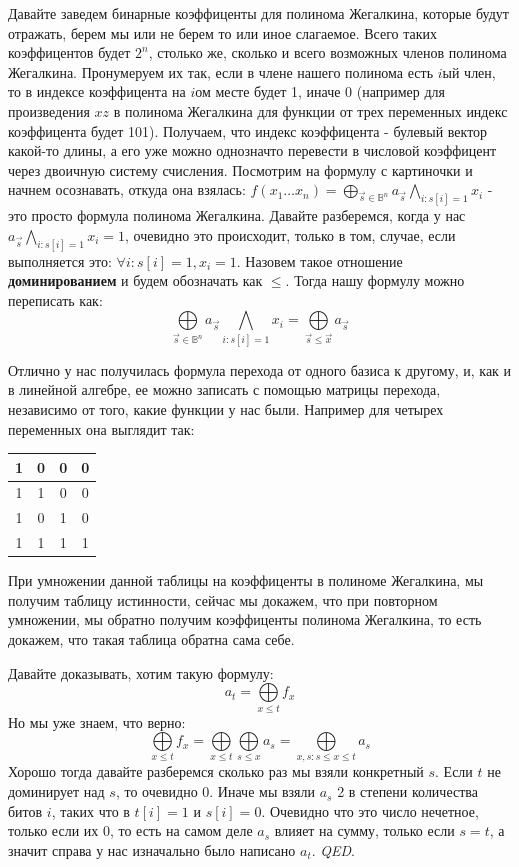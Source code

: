 \documentclass{article}
\begin{document}
Давайте заведем бинарные коэффиценты для полинома Жегалкина, которые будут отражать, берем мы или не берем то или иное слагаемое. Всего таких коэффицентов будет $2^n$, столько же, сколько и всего возможных членов полинома Жегалкина. Пронумеруем их так, если в члене нашего полинома есть $i$ый член, то в индексе коэффицента на $i$ом месте будет 1, иначе 0 (например для произведения $xz$ в полинома Жегалкина для функции от трех переменных индекс коэффицента будет 101). Получаем, что индекс коэффицента - булевый вектор какой-то длины, а его уже можно однозначто перевести в числовой коэффицент через двоичную систему счисления.
\newpage
Посмотрим на формулу с картиночки и начнем осознавать, откуда она взялась:
$\displaystyle f(x_1\dots x_n) = \bigoplus\limits_{\overrightarrow{s}\in\mathbb{B}^n}a_{\overrightarrow{s}}\bigwedge\limits_{i:s[i]=1}x_i$ - это просто формула полинома Жегалкина. Давайте разберемся, когда у нас $a_{\overrightarrow{s}}\bigwedge\limits_{i:s[i]=1}x_i=1$, очевидно это происходит, только в том, случае, если выполняется это: $\forall i : s[i] = 1, x_i = 1$. Назовем такое отношение \textbf{доминированием} и будем обозначать как $\leq$.
Тогда нашу формулу можно переписать как: $$\bigoplus\limits_{\overrightarrow{s}\in\mathbb{B}^n}a_{\overrightarrow{s}}\bigwedge\limits_{i:s[i]=1}x_i = \bigoplus\limits_{\overrightarrow{s}\leq \overrightarrow{x}} a_{\overrightarrow{s}}$$ 

Отлично у нас получилась формула перехода от одного базиса к другому, и, как и в линейной алгебре, ее можно записать с помощью матрицы перехода, независимо от того, какие функции у нас были. Например для четырех переменных она выглядит так:

\parbox{\textwidth}{
    \centering
    \begin{tabular}{ |c|c|c|c| }
        \hline
         1 & 0 & 0 & 0 \\
        \hline
         1 & 1 & 0 & 0 \\
        \hline
         1 & 0 & 1 & 0 \\
        \hline
         1 & 1 & 1 & 1 \\
        \hline
    \end{tabular}
}


При умножении данной таблицы на коэффиценты в полиноме Жегалкина, мы получим таблицу истинности, сейчас мы докажем, что при повторном умножении, мы обратно получим коэффиценты полинома Жегалкина, то есть докажем, что такая таблица обратна сама себе.

Давайте доказывать, хотим такую формулу: $$a_t=\bigoplus\limits_{x\leq t}f_x $$ Но мы уже знаем, что верно: $$\bigoplus\limits_{x\leq t}f_x = \bigoplus\limits_{x\leq t}\bigoplus\limits_{s\leq x}a_s=\bigoplus\limits_{x,s : s\leq x \leq t}a_s$$
Хорошо тогда давайте разберемся сколько раз мы взяли конкретный $s$. Если $t$ не доминирует над $s$, то очевидно 0. Иначе мы взяли $a_s$ 2 в степени количества битов $i$, таких что в $t[i]=1$ и $s[i]=0$. Очевидно что это число нечетное, только если их 0, то есть на самом деле $a_s$ влияет на сумму, только если $s=t$, а значит справа у нас изначально было написано $a_t$. \textit{QED}.
\end{document}
